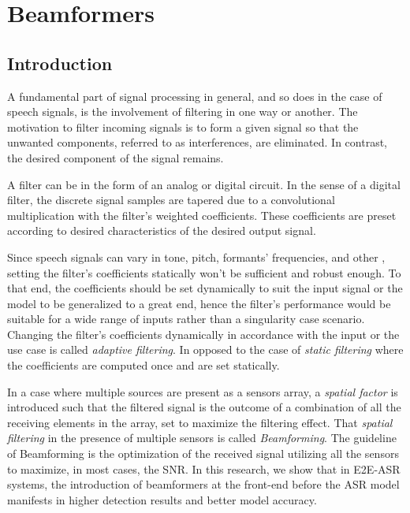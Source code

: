 \chapter{Beamformers}
\section{Introduction}
A fundamental part of signal processing in general, 
and so does in the case of speech signals, 
is the involvement of filtering in one way or another.  
The motivation to filter incoming signals 
is to form a given signal so that the unwanted components, 
referred to as interferences, are eliminated. 
In contrast, the desired component of the signal remains.

A filter can be in the form of an analog or digital circuit. 
In the sense of a digital filter, 
the discrete signal samples are tapered 
due to a convolutional multiplication with 
the filter's weighted coefficients.
These coefficients are preset according 
to desired characteristics of the desired output signal.

Since speech signals can vary in tone, pitch, 
formants' frequencies, and other , setting the filter's 
coefficients statically won't be sufficient 
and robust enough.
To that end, the coefficients should be set dynamically
to suit the input signal or the model to be generalized 
to a great end, hence the filter's performance 
would be suitable for a wide range of inputs rather than
a singularity case scenario.
Changing the filter's coefficients dynamically in accordance
with the input or the use case is called \emph{adaptive filtering}.
In opposed to the case of \emph{static filtering} where 
the coefficients are computed once and are set statically. 

In a case where multiple sources are present
as a sensors array, a \emph{spatial factor} is introduced
such that the filtered signal is the outcome of
a combination of all the receiving elements
in the array, set to maximize the filtering effect.
That \emph{spatial filtering} in the presence of
multiple sensors is called \emph{Beamforming}.
The guideline of Beamforming is the optimization of
the received signal utilizing all the sensors
to maximize, in most cases, the SNR.
In this research, we show that in E2E-ASR systems,
the introduction of beamformers at the front-end before
the ASR model manifests in higher detection results
and better model accuracy.

